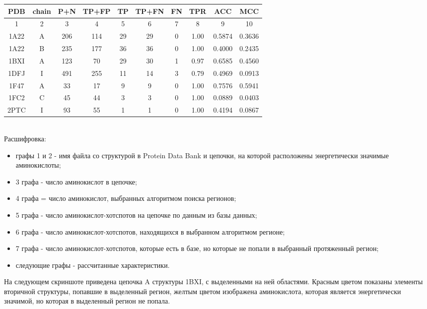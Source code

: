 \begin{tabular}{|c|c|c|c|c|c|c|c|c|c|}
\hline
 PDB & chain & P+N & TP+FP & TP & TP+FN & FN & TPR & ACC & MCC\\
 \hline
  1 & 2 & 3 & 4 & 5 & 6 & 7 & 8 & 9 & 10\\
 \hline
1A22 & A & 206 & 114 & 29 & 29 & 0 & 1.00 & 0.5874 & 0.3636\\
1A22 & B & 235 & 177 & 36 & 36 & 0 & 1.00 &
0.4000 & 0.2435
\\
1BXI & A & 123 & 70& 29& 30& 1 & 0.97 &
0.6585 & 0.4560
\\
1DFJ & I & 491 & 255& 11& 14& 3 & 0.79 &
0.4969 & 0.0913
\\
1F47 & A & 33 & 17&	9& 9& 0 & 1.00 &
0.7576 & 0.5941
\\
1FC2 & C & 45 & 44&	3& 3& 0 & 1.00 &
0.0889 & 0.0403
\\
2PTC & I & 93 & 55&	1& 1& 0 & 1.00 &
0.4194 & 0.0867\\
\hline
\end{tabular}
\\[10pt]
Расшифровка: 
\begin{itemize}
\item графы 1 и 2 - имя файла со структурой в Protein Data Bank и цепочки, на которой расположены энергетически значимые аминокислоты;
\item 3 графа - число аминокислот в цепочке;
\item 4 графа = число аминокислот, выбранных алгоритмом поиска регионов;
\item 5 графа - число аминокислот-хотспотов на цепочке по данным из базы данных;
\item 6 графа - число аминокислот-хотспотов, находящихся в выбранном алгоритмом регионе;
\item 7 графа - число аминокислот-хотспотов, которые есть в базе, но которые не попали в выбранный протяженный регион;
\item следующие графы - рассчитанные характеристики.
\end{itemize}

На следующем скриншоте приведена цепочка A структуры 1BXI, с выделенными на ней областями. Красным цветом показаны элементы вторичной структуры, попавшие в выделенный регион, желтым цветом изображена аминокислота, которая является энергетически значимой, но которая в выделенный регион не попала.
 


